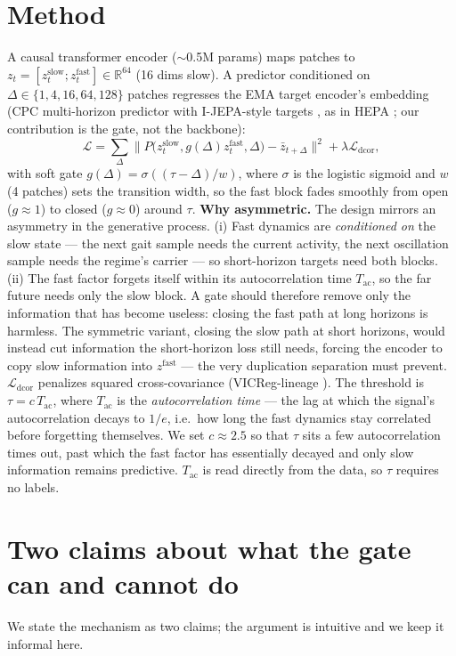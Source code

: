 \documentclass[10pt,twocolumn]{article}
\begin{document}
\section{Method}
A causal transformer encoder ($\sim$0.5M params) maps patches to
$z_t=[z^{\mathrm{slow}}_t;z^{\mathrm{fast}}_t]\in\mathbb R^{64}$ (16 dims
slow). A predictor conditioned on $\Delta\in\{1,4,16,64,128\}$ patches
regresses the EMA target encoder's embedding (CPC multi-horizon predictor
\cite{oord2018representation} with I-JEPA-style targets
\cite{assran2023self,baevski2022data2vec}, as in HEPA \cite{hepa2026}; our
contribution is the gate, not the backbone):
\[
\mathcal L=\textstyle\sum_{\Delta}\big\|
P\big(z^{\mathrm{slow}}_t, g(\Delta)z^{\mathrm{fast}}_t, \Delta\big)
-\bar z_{t+\Delta}\big\|^2+\lambda\mathcal L_{\mathrm{dcor}},
\]
with soft gate $g(\Delta)=\sigma((\tau-\Delta)/w)$, where $\sigma$ is the
logistic sigmoid and $w$ (4 patches) sets the transition width, so the fast
block fades smoothly from open ($g{\approx}1$) to closed ($g{\approx}0$)
around $\tau$. \textbf{Why asymmetric.} The design mirrors an asymmetry in the
generative process. (i) Fast dynamics are \emph{conditioned on} the slow
state --- the next gait sample needs the current activity, the next
oscillation sample needs the regime's carrier --- so short-horizon targets
need both blocks. (ii) The fast factor forgets itself within its autocorrelation
time $T_{\mathrm{ac}}$, so the far future needs only the slow block. A gate should
therefore remove only the information that has become useless: closing the
fast path at long horizons is harmless. The symmetric variant, closing the
slow path at short horizons, would instead cut information the short-horizon
loss still needs, forcing the encoder to copy slow information into
$z^{\mathrm{fast}}$ --- the very duplication separation must prevent.
$\mathcal L_{\mathrm{dcor}}$ penalizes squared cross-covariance
(VICReg-lineage \cite{bardes2022vicreg}). The threshold is $\tau=c\,T_{\mathrm{ac}}$, where $T_{\mathrm{ac}}$ is the
\emph{autocorrelation time} --- the lag at which the signal's autocorrelation
decays to $1/e$, i.e.\ how long the fast dynamics stay correlated before
forgetting themselves. We set $c\!\approx\!2.5$ so that $\tau$ sits a few
autocorrelation times out, past which the fast factor has essentially decayed
and only slow information remains predictive. $T_{\mathrm{ac}}$ is read
directly from the data, so $\tau$ requires no labels.

\section{Two claims about what the gate can and cannot do}
We state the mechanism as two claims; the argument is intuitive and we keep it
informal here.
\end{document}
